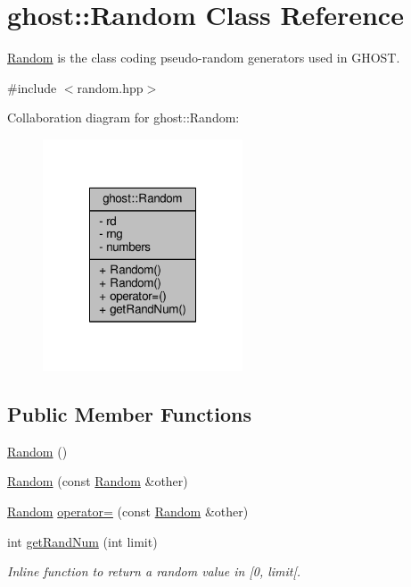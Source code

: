 \hypertarget{classghost_1_1Random}{\section{ghost\-:\-:Random Class Reference}
\label{classghost_1_1Random}
}


\hyperlink{classghost_1_1Random}{Random} is the class coding pseudo-\/random generators used in G\-H\-O\-S\-T.  




{\ttfamily \#include $<$random.\-hpp$>$}



Collaboration diagram for ghost\-:\-:Random\-:\nopagebreak
\begin{figure}[H]
\begin{center}
\leavevmode
\includegraphics[width=168pt]{classghost_1_1Random__coll__graph}
\end{center}
\end{figure}
\subsection*{Public Member Functions}
\begin{DoxyCompactItemize}
\item 
\hyperlink{classghost_1_1Random_a7c45efd1f7c522a68760104ba6084d89}{Random} ()
\item 
\hyperlink{classghost_1_1Random_aa57a39ee45a9ba30d7f7ea2c4c17b539}{Random} (const \hyperlink{classghost_1_1Random}{Random} \&other)
\item 
\hyperlink{classghost_1_1Random}{Random} \hyperlink{classghost_1_1Random_a6e5cb2eeaee9846a1ca8fe1ee6749c00}{operator=} (const \hyperlink{classghost_1_1Random}{Random} \&other)
\item 
int \hyperlink{classghost_1_1Random_a26f7e445a05839bd89ca9c14f8b34fbc}{get\-Rand\-Num} (int limit)
\begin{DoxyCompactList}\small\item\em Inline function to return a random value in \mbox{[}0, limit\mbox{[}. \end{DoxyCompactList}\end{DoxyCompactItemize}
